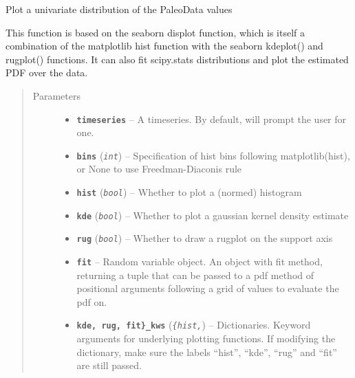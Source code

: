 \documentclass[letterpaper,10pt,english]{sphinxmanual}
\begin{document}

\begin{fulllineitems}
\label{Main:pyleoclim.histTs}
Plot a univariate distribution of the PaleoData values

This function is based on the seaborn displot function, which is
itself a combination of the matplotlib hist function with the
seaborn kdeplot() and rugplot() functions. It can also fit
scipy.stats distributions and plot the estimated PDF over the data.
\begin{quote}\begin{description}
\item[{Parameters}] \leavevmode\begin{itemize}
\item {} 
\textbf{\texttt{timeseries}} -- A timeseries. By default, will prompt the user for one.

\item {} 
\textbf{\texttt{bins}} (\emph{\texttt{int}}) -- Specification of hist bins following matplotlib(hist),
or None to use Freedman-Diaconis rule

\item {} 
\textbf{\texttt{hist}} (\emph{\texttt{bool}}) -- Whether to plot a (normed) histogram

\item {} 
\textbf{\texttt{kde}} (\emph{\texttt{bool}}) -- Whether to plot a gaussian kernel density estimate

\item {} 
\textbf{\texttt{rug}} (\emph{\texttt{bool}}) -- Whether to draw a rugplot on the support axis

\item {} 
\textbf{\texttt{fit}} -- Random variable object. An object with fit method, returning
a tuple that can be passed to a pdf method of positional
arguments following a grid of values to evaluate the pdf on.

\item {} 
\textbf{\texttt{kde, rug, fit\}\_kws}} (\emph{\texttt{\{hist,}}) -- Dictionaries. Keyword arguments for
underlying plotting functions. If modifying the dictionary, make
sure the labels ``hist'', ``kde'', ``rug'' and ``fit'' are still passed.


\end{itemize}
\end{description}
\end{quote}
\end{fulllineitems}
\end{document}
